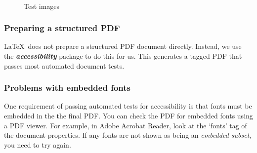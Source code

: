 \documentclass[12pt,letterpaper]{article}
\newcommand{\packagename}[1]{\textbf{\emph{#1}}}
\begin{document}
\begin{figure}[htp]
\centering
{}
~
\caption{Test images}\label{fig:TestimagesWithAltText}
\end{figure}

\subsubsection{Preparing a structured PDF}\label{sec:PDFprep}
\LaTeX\ does not prepare a structured PDF document directly. Instead, we use the \packagename{accessibility} package to do this for us. This generates a tagged PDF that passes most automated document tests.

\subsubsection{Problems with embedded fonts}
One requirement of passing automated tests for accessibility is that fonts must be embedded in the the final PDF. You can check the PDF for embedded fonts using a PDF viewer. For example, in Adobe Acrobat Reader, look at the `fonts' tag of the document properties. If any fonts are not shown as being an \emph{embedded subset}, you need to try again. 
\end{document}
